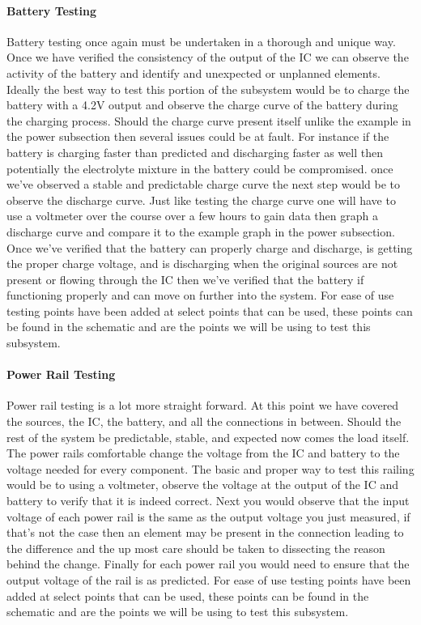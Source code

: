 \paragraph{Battery Testing}
Battery testing once again must be undertaken in a thorough and unique way. Once we have verified the consistency of the output of the IC we can observe the activity of the battery and identify and unexpected or unplanned elements. Ideally the best way to test this portion of the subsystem would be to charge the battery with a 4.2V output and observe the charge curve of the battery during the charging process. Should the charge curve present itself unlike the example in the power subsection then several issues could be at fault. For instance if the battery is charging faster than predicted and discharging faster as well then potentially the electrolyte mixture in the battery could be compromised. once we've observed a stable and predictable charge curve the next step would be to observe the discharge curve. Just like testing the charge curve one will have to use a voltmeter over the course over a few hours to gain data then graph a discharge curve and compare it to the example graph in the power subsection. Once we've verified that the battery can properly charge and discharge, is getting the proper charge voltage, and is discharging when the original sources are not present or flowing through the IC then we've verified that the battery if functioning properly and can move on further into the system. For ease of use testing points have been added at select points that can be used, these points can be found in the schematic and are the points we will be using to test this subsystem.
\paragraph{Power Rail Testing}
Power rail testing is a lot more straight forward. At this point we have covered the sources, the IC, the battery, and all the connections in between. Should the rest of the system be predictable, stable, and expected now comes the load itself. The power rails comfortable change the voltage from the IC and battery to the voltage needed for every component. The basic and proper way to test this railing would be to using a voltmeter, observe the voltage at the output of the IC and battery to verify that it is indeed correct. Next you would observe that the input voltage of each power rail is the same as the output voltage you just measured, if that's not the case then an element may be present in the connection leading to the difference and the up most care should be taken to dissecting the reason behind the change. Finally for each power rail you would need to ensure that the output voltage of the rail is as predicted. For ease of use testing points have been added at select points that can be used, these points can be found in the schematic and are the points we will be using to test this subsystem.
